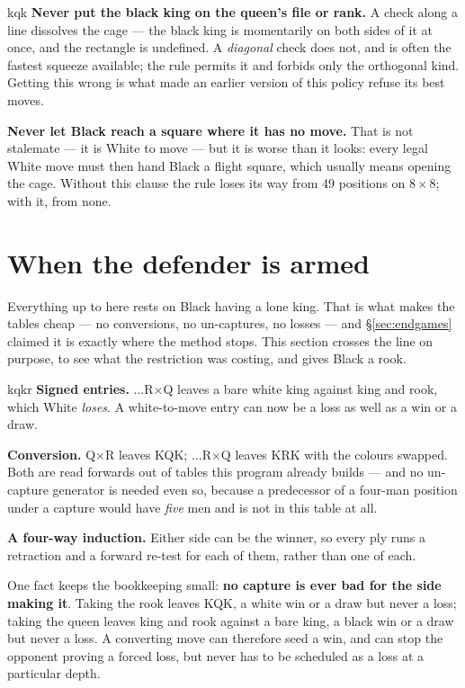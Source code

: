 \documentclass[11pt]{article}
\begin{document}
\begin{result}[title={The two rules that look unnecessary, and are not}]{kqk}
\textbf{Never put the black king on the queen's file or rank.} A check along a
line dissolves the cage --- the black king is momentarily on both sides of it
at once, and the rectangle is undefined. A \emph{diagonal} check does not, and
is often the fastest squeeze available; the rule permits it and forbids only
the orthogonal kind. Getting this wrong is what made an earlier version of this
policy refuse its best moves.

\smallskip
\textbf{Never let Black reach a square where it has no move.} That is not
stalemate --- it is White to move --- but it is worse than it looks: every
legal White move must then hand Black a flight square, which usually means
opening the cage. Without this clause the rule loses its way from 49 positions
on $8\times8$; with it, from none.
\end{result}

\clearpage
\section{When the defender is armed}\label{sec:kqkr}

Everything up to here rests on Black having a lone king. That is what makes
the tables cheap --- no conversions, no un-captures, no losses --- and \S\ref{sec:endgames}
claimed it is exactly where the method stops. This section crosses the line on
purpose, to see what the restriction was costing, and gives Black a rook.

\begin{result}[title={Three things KQKR needs that none of the others do}]{kqkr}
\textbf{Signed entries.} $\ldots$R$\times$Q leaves a bare white king against
king and rook, which White \emph{loses}. A white-to-move entry can now be a
loss as well as a win or a draw.

\smallskip
\textbf{Conversion.} Q$\times$R leaves KQK; $\ldots$R$\times$Q leaves KRK with
the colours swapped. Both are read forwards out of tables this program already
builds --- and no un-capture generator is needed even so, because a predecessor
of a four-man position under a capture would have \emph{five} men and is not in
this table at all.

\smallskip
\textbf{A four-way induction.} Either side can be the winner, so every ply runs
a retraction and a forward re-test for each of them, rather than one of each.

\medskip
One fact keeps the bookkeeping small: \textbf{no capture is ever bad for the
side making it}. Taking the rook leaves KQK, a white win or a draw but never a
loss; taking the queen leaves king and rook against a bare king, a black win or
a draw but never a loss. A converting move can therefore seed a win, and can
stop the opponent proving a forced loss, but never has to be scheduled as a
loss at a particular depth.
\end{result}
\end{document}
